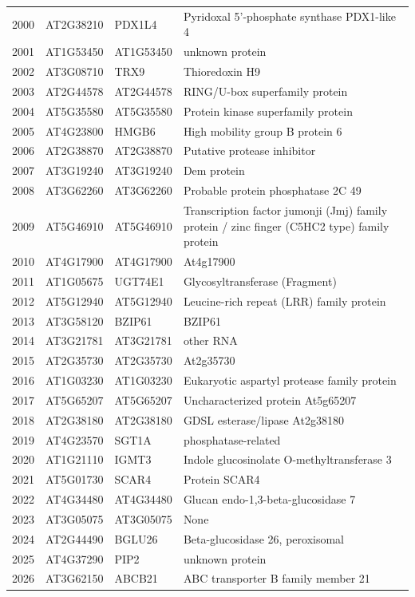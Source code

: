 \documentclass[11pt]{article}
\begin{document}
\begin{center}
\begin{tabular}{rlll}
2000 & AT2G38210 & PDX1L4 & Pyridoxal 5'-phosphate synthase PDX1-like 4\\
2001 & AT1G53450 & AT1G53450 & unknown protein\\
2002 & AT3G08710 & TRX9 & Thioredoxin H9\\
2003 & AT2G44578 & AT2G44578 & RING/U-box superfamily protein\\
2004 & AT5G35580 & AT5G35580 & Protein kinase superfamily protein\\
2005 & AT4G23800 & HMGB6 & High mobility group B protein 6\\
2006 & AT2G38870 & AT2G38870 & Putative protease inhibitor\\
2007 & AT3G19240 & AT3G19240 & Dem protein\\
2008 & AT3G62260 & AT3G62260 & Probable protein phosphatase 2C 49\\
2009 & AT5G46910 & AT5G46910 & Transcription factor jumonji (Jmj) family protein / zinc finger (C5HC2 type) family protein\\
2010 & AT4G17900 & AT4G17900 & At4g17900\\
2011 & AT1G05675 & UGT74E1 & Glycosyltransferase (Fragment)\\
2012 & AT5G12940 & AT5G12940 & Leucine-rich repeat (LRR) family protein\\
2013 & AT3G58120 & BZIP61 & BZIP61\\
2014 & AT3G21781 & AT3G21781 & other RNA\\
2015 & AT2G35730 & AT2G35730 & At2g35730\\
2016 & AT1G03230 & AT1G03230 & Eukaryotic aspartyl protease family protein\\
2017 & AT5G65207 & AT5G65207 & Uncharacterized protein At5g65207\\
2018 & AT2G38180 & AT2G38180 & GDSL esterase/lipase At2g38180\\
2019 & AT4G23570 & SGT1A & phosphatase-related\\
2020 & AT1G21110 & IGMT3 & Indole glucosinolate O-methyltransferase 3\\
2021 & AT5G01730 & SCAR4 & Protein SCAR4\\
2022 & AT4G34480 & AT4G34480 & Glucan endo-1,3-beta-glucosidase 7\\
2023 & AT3G05075 & AT3G05075 & None\\
2024 & AT2G44490 & BGLU26 & Beta-glucosidase 26, peroxisomal\\
2025 & AT4G37290 & PIP2 & unknown protein\\
2026 & AT3G62150 & ABCB21 & ABC transporter B family member 21\\

\end{tabular}
\end{center}
\end{document}
